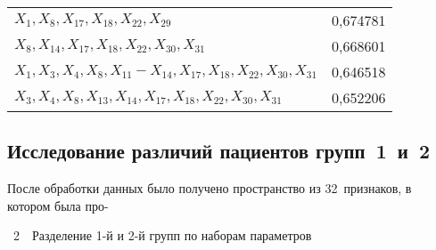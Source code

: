 \begin{multicols}{2}
\begin{table*}[b]
\begin{center}
\begin{tabular}{|l|c|}
            $X_1, X_8, X_{17}, X_{18}, X_{22}, X_{29}  $ & 0,674781     \\
            $ X_8, X_{14}, X_{17}, X_{18}, X_{22}, X_{30}, X_{31}    $ & 0,668601  \\
            $ X_1, X_3, X_4, X_8, X_{11} - X_{14}, X_{17}, X_{18}, X_{22}, X_{30}, X_{31}   $ & 0,646518  \\
            $ X_3, X_4, X_8, X_{13}, X_{14}, X_{17}, X_{18}, X_{22}, X_{30}, X_{31}  $ & 0,652206  \\
            \hline
        \end{tabular}
\end{center}
        \end{table*}


\vspace*{-4pt}

\subsection{Исследование различий пациентов групп~1~и~2}

После обработки данных было получено пространство из 32~признаков, в
котором была про-\linebreak\vspace*{-12pt}



\noindent
{{\tablename~2}\ \ \small{Разделение 1-й и 2-й групп по наборам параметров}}
                

\end{multicols}
